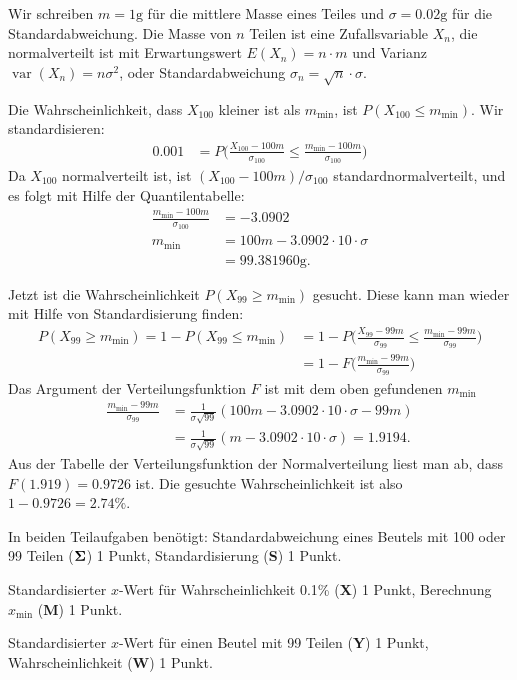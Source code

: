 \begin{loesung}
Wir schreiben $m=1\text{g}$ für die mittlere Masse eines Teiles und
$\sigma=0.02\text{g}$ für die Standardabweichung.
Die Masse von $n$ Teilen ist eine Zufallsvariable $X_n$, die normalverteilt
ist mit Erwartungswert $E(X_n)=n\cdot m$ und Varianz
$\operatorname{var}(X_n)=n\sigma^2$, oder Standardabweichung
$\sigma_n=\sqrt{n}\cdot\sigma$.
\begin{teilaufgaben}
\item Die Wahrscheinlichkeit, dass $X_{100}$ kleiner ist als $m_{\text{min}}$,
ist
\(
P(X_{100}\le m_{\text{min}})
\). Wir standardisieren:
\begin{align*}
0.001 &= P\biggl(
\frac{X_{100}-100m}{\sigma_{100}}\le \frac{m_{\text{min}}-100m}{\sigma_{100}}
\biggr)
\end{align*}
Da $X_{100}$ normalverteilt ist, ist $(X_{100}-100m)/\sigma_{100}$
standardnormalverteilt, und es folgt mit Hilfe der Quantilentabelle:
\begin{align*}
\frac{m_{\text{min}}-100m}{\sigma_{100}}&=-3.0902\\
m_{\text{min}}&=100m-3.0902\cdot 10\cdot \sigma
\\
&=99.381960\text{g}.
\end{align*}
\item Jetzt ist die Wahrscheinlichkeit $P(X_{99} \ge m_{\text{min}})$ gesucht.
Diese kann man wieder mit Hilfe von Standardisierung finden:
\begin{align*}
P(X_{99} \ge m_{\text{min}})
=
1-P(X_{99} \le m_{\text{min}})
&=
1-P\biggl(
\frac{X_{99}-99m}{\sigma_{99}}\le \frac{m_{\text{min}} - 99m}{\sigma_{99}}
\biggr)
\\
&=1-F\biggl(
\frac{m_{\text{min}} - 99m}{\sigma_{99}}
\biggr)
\end{align*}
Das Argument der Verteilungsfunktion $F$ ist mit dem oben gefundenen
$m_{\text{min}}$
\begin{align*}
\frac{m_{\text{min}} - 99m}{\sigma_{99}}
&=
\frac1{\sigma\sqrt{99}}(
100m-3.0902\cdot 10\cdot \sigma-99m)\\
&=
\frac1{\sigma\sqrt{99}}(m-3.0902\cdot 10\cdot \sigma)
=1.9194.
\end{align*}
Aus der Tabelle der Verteilungsfunktion der Normalverteilung liest man
ab, dass $F(1.919)=0.9726$ ist. Die gesuchte Wahrscheinlichkeit ist
also $1-0.9726=2.74\%$.
\qedhere
\end{teilaufgaben}
\end{loesung}

\begin{bewertung}
In beiden Teilaufgaben benötigt:
Standardabweichung eines Beutels  mit 100 oder 99 Teilen
($\bf \Sigma$) 1 Punkt,
Standardisierung (\textbf{S}) 1 Punkt.
\begin{teilaufgaben}
\item
Standardisierter $x$-Wert für Wahrscheinlichkeit 0.1\% (\textbf{X}) 1 Punkt,
Berechnung $x_{\text{min}}$ (\textbf{M}) 1 Punkt.
\item
Standardisierter $x$-Wert für einen Beutel mit 99 Teilen (\textbf{Y}) 1 Punkt,
Wahrscheinlichkeit (\textbf{W}) 1 Punkt.
\end{teilaufgaben}
\end{bewertung}

